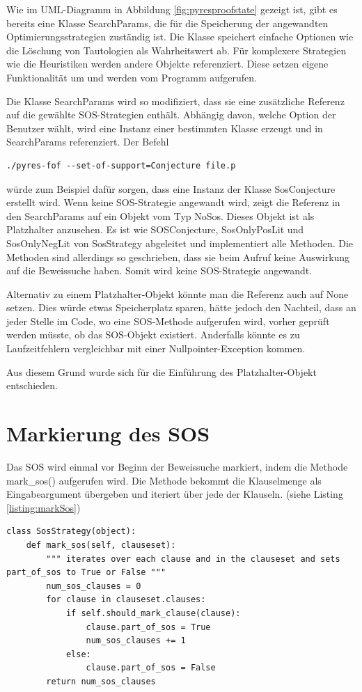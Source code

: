 Wie im UML-Diagramm in Abbildung \ref{fig:pyresproofstate} gezeigt ist, gibt es bereits eine Klasse
SearchParams, die für die Speicherung der angewandten Optimierungsstrategien zuständig ist. Die Klasse speichert einfache Optionen wie die Löschung von Tautologien als Wahrheitswert ab. Für komplexere Strategien wie die Heuristiken werden andere Objekte referenziert. Diese setzen eigene Funktionalität um und werden vom Programm aufgerufen.

Die Klasse SearchParams wird so modifiziert, dass sie eine zusätzliche Referenz auf die gewählte SOS-Strategien enthält. Abhängig davon, welche Option der Benutzer wählt, wird eine Instanz einer bestimmten Klasse erzeugt und in SearchParams referenziert. Der Befehl
\begin{lstlisting}
./pyres-fof --set-of-support=Conjecture file.p
\end{lstlisting}
würde zum Beispiel dafür sorgen, dass eine Instanz der Klasse SosConjecture erstellt wird. 
Wenn keine SOS-Strategie angewandt wird, zeigt die Referenz in den SearchParams auf ein Objekt vom Typ NoSos. Dieses Objekt ist als Platzhalter anzusehen. Es ist wie SOSConjecture, SosOnlyPosLit und SosOnlyNegLit von SosStrategy abgeleitet und implementiert alle Methoden. Die Methoden sind allerdings so geschrieben, dass sie beim Aufruf keine Auswirkung auf die Beweissuche haben. Somit wird keine SOS-Strategie angewandt.

Alternativ zu einem Platzhalter-Objekt könnte man die Referenz auch auf None setzen. Dies würde etwas Speicherplatz sparen, hätte jedoch den Nachteil, dass an jeder Stelle im Code, wo eine SOS-Methode aufgerufen wird, vorher geprüft werden müsste, ob das SOS-Objekt existiert. Anderfalls könnte es zu Laufzeitfehlern vergleichbar mit einer Nullpointer-Exception kommen. 

Aus diesem Grund wurde sich für die Einführung des Platzhalter-Objekt entschieden.
\section{Markierung des SOS}
\label{section:4.2}

Das SOS wird einmal vor Beginn der Beweissuche markiert, indem die Methode mark\_sos() aufgerufen wird. Die Methode bekommt die Klauselmenge als Eingabeargument übergeben und iteriert über jede der Klauseln. (siehe Listing \ref{listing:markSos})

\begin{lstlisting}[caption={Methode zur Markierung des SOS}, label={listing:markSos}]
class SosStrategy(object):
	def mark_sos(self, clauseset):
		""" iterates over each clause and in the clauseset and sets part_of_sos to True or False """
		num_sos_clauses = 0
		for clause in clauseset.clauses:
			if self.should_mark_clause(clause):
				clause.part_of_sos = True
				num_sos_clauses += 1
			else:
				clause.part_of_sos = False
		return num_sos_clauses
\end{lstlisting}

